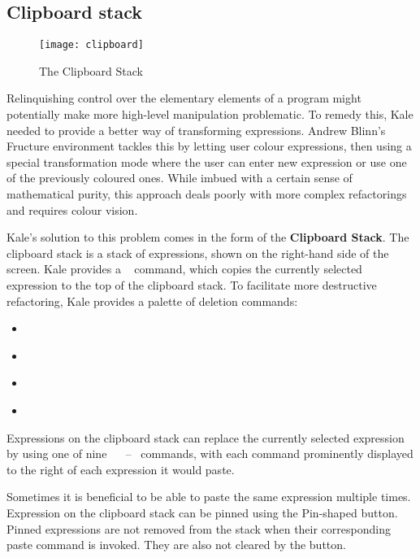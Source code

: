 \needspace{7cm}
\subsection{Clipboard stack}
\label{soln:clipboard_list}
\begin{wrapfigure}[15]{R}{0pt}
	\texttt{[image: clipboard]}
	\caption{The Clipboard Stack}
\end{wrapfigure}

Relinquishing control over the elementary elements of a program might
potentially make more high-level manipulation problematic. To remedy this,
Kale needed to provide a better way of transforming expressions. Andrew Blinn's
Fructure \cite{Fructure} environment tackles this by letting user colour
expressions, then
using a special transformation mode where the user can enter new expression or
use one of the previously coloured ones. While imbued with a certain sense of
mathematical purity, this approach deals poorly with more complex refactorings
and requires colour vision.

Kale's solution to this problem comes in the form of the \textbf{Clipboard Stack}. The
clipboard stack is a stack of expressions, shown on the right-hand side of the
screen. Kale provides a \hyperref[cmd:copy]{}~ command, which
copies the currently
selected expression to the top of the clipboard stack. To facilitate more
destructive refactoring, Kale provides a palette of deletion commands:

\begin{itemize}[noitemsep]
	\item \hyperref[cmd:delete]{} \keys{\backspace}
	\item \hyperref[cmd:cut]{} 
	\item \hyperref[cmd:delete_blank]{} 
	\item \hyperref[cmd:cut_blank]{} 
\end{itemize}

Expressions on the clipboard stack can replace the currently selected
expression by using one of nine \hyperref[cmd:paste]{}~
~--~ commands, with each command prominently displayed
to the right of each expression it would paste.

Sometimes it is beneficial to be able to paste the same expression multiple
times. Expression on the clipboard stack can be pinned using the Pin-shaped
button. Pinned expressions are not removed from the stack when their
corresponding paste command is invoked.
They are also not cleared by the  button.

